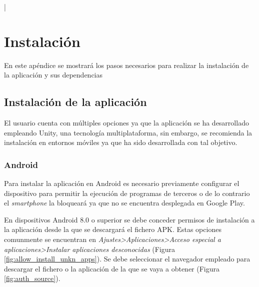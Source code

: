 |\chapter{Instalación} \label{chapter:manual_instalacion}

En este apéndice se mostrará los pasos necesarios para realizar la instalación de la aplicación y sus dependencias

\section{Instalación de la aplicación}
El usuario cuenta con múltiples opciones ya que la aplicación se ha desarrollado empleando Unity, una tecnología multiplataforma, 
sin embargo, se recomienda la instalación en entornos móviles ya que ha sido desarrollada con tal objetivo.

\subsection{Android}
Para instalar la aplicación en Android es necesario previamente configurar el dispositivo para permitir 
la ejecución de programas de terceros o de lo contrario el \textit{smartphone}
la bloqueará ya que no se encuentra desplegada en Google Play.

En dispositivos Android 8.0 o superior se debe conceder permisos de instalación a la aplicación desde 
la que se descargará el fichero APK. Estas opciones comunmente se encuentran en 
\textit{Ajustes>Aplicaciones>Acceso especial a aplicaciones>Instalar aplicaciones desconocidas} (Figura \ref{fig:allow_install_unkn_apps}).
Se debe seleccionar el navegador empleado para descargar el fichero o la aplicación de la que se vaya 
a obtener (Figura \ref{fig:auth_source}).

